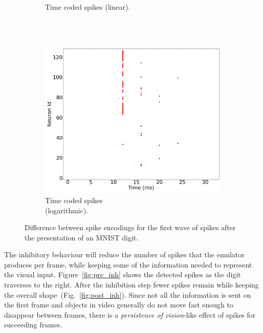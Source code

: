 \documentclass[conference]{IEEEtran}
\begin{document}
\begin{figure}[htb]
\begin{subfigure}[b]{0.3\textwidth}
    \caption{Time coded spikes (linear).\\~}
    \label{fig:time_spikes}
  \end{subfigure}~
  \begin{subfigure}[b]{0.3\textwidth}
    \includegraphics[width=\textwidth]{time_exp_coded_-8x8-_cycle_0}
    \caption{Time coded spikes \\(logarithmic).}
    \label{fig:time_exp_spikes}
  \end{subfigure}
  
  \caption{Difference between spike encodings for the first wave of spikes after the presentation of an MNIST digit.}
  \label{fig:spike_codes}
\end{figure}


The inhibitory behaviour will reduce the number of spikes that the emulator produces per frame, while keeping some of the information needed to represent the visual input. Figure~\ref{fig:pre_inh} shows the detected spikes as the digit traverses to the right. After the inhibition step fewer spikes remain while keeping the overall shape~(Fig.~\ref{fig:post_inh}). Since not all the information is sent on the first frame and objects in video generally do not move fast enough to disappear between frames, there is a \textit{persistence of vision}-like effect of spikes for succeeding frames.
\end{document}
